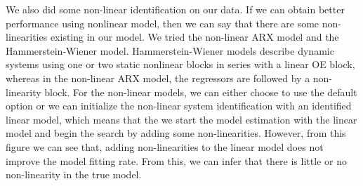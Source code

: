 \documentclass[]{article}
\begin{document}
We also did some non-linear identification on our data. If we can obtain better performance using nonlinear model, then we can say that there are some non-linearities existing in our model. We tried the non-linear ARX model and the Hammerstein-Wiener model. Hammerstein-Wiener models describe dynamic systems using one or two static nonlinear blocks in series with a linear OE block, whereas in the non-linear ARX model, the regressors are followed by a non-linearity block. For the non-linear models, we can either choose to use the default option or we can initialize the non-linear system identification with an identified linear model, which means that the we start the model estimation with the linear model and begin the search by adding some non-linearities. However, from this figure we can see that, adding non-linearities to the linear model does not improve the model fitting rate. From this, we can infer that there is little or no non-linearity in the true model. 
\end{document}
